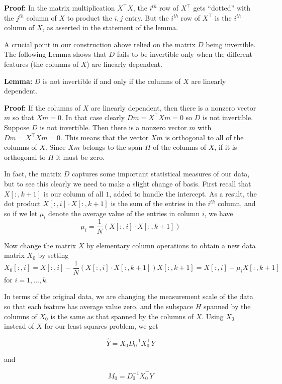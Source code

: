 \documentclass[
  oneside]{scrbook}
\begin{document}
\textbf{Proof:} In the matrix multiplication \(X^{\intercal}X\), the
\(i^{th}\) row of \(X^{\intercal}\) gets ``dotted'' with the \(j^{th}\)
column of \(X\) to product the \(i,j\) entry. But the \(i^{th}\) row of
\(X^{\intercal}\) is the \(i^{th}\) column of \(X\), as asserted in the
statement of the lemma.

A crucial point in our construction above relied on the matrix \(D\)
being invertible. The following Lemma shows that \(D\) fails to be
invertible only when the different features (the columns of \(X\)) are
linearly dependent.

\textbf{Lemma:} \(D\) is not invertible if and only if the columns of
\(X\) are linearly dependent.

\textbf{Proof:} If the columns of \(X\) are linearly dependent, then
there is a nonzero vector \(m\) so that \(Xm=0\). In that case clearly
\(Dm=X^{\intercal}Xm=0\) so \(D\) is not invertible. Suppose \(D\) is
not invertible. Then there is a nonzero vector \(m\) with
\(Dm=X^{\intercal}Xm=0\). This means that the vector \(Xm\) is
orthogonal to all of the columns of \(X\). Since \(Xm\) belongs to the
span \(H\) of the columns of \(X\), if it is orthogonal to \(H\) it must
be zero.

In fact, the matrix \(D\) captures some important statistical measures
of our data, but to see this clearly we need to make a slight change of
basis. First recall that \(X[:,k+1]\) is our column of all \(1\), added
to handle the intercept. As a result, the dot product
\(X[:,i]\cdot X[:,k+1]\) is the sum of the entries in the \(i^{th}\)
column, and so if we let \(\mu_{i}\) denote the average value of the
entries in column \(i\), we have \[ \mu_{i} = \frac{1}{N}(X[:,i]\cdot
X[:,k+1]) \]

Now change the matrix \(X\) by elementary column operations to obtain a
new data matrix \(X_{0}\) by setting \[ X_{0}[:,i] =
X[:,i]-\frac{1}{N}(X[:,i]\cdot X[:,k+1])X[:,k+1] =
X[:,i]-\mu_{i}X[:,k+1] \] for \(i=1,\ldots, k\).

In terms of the original data, we are changing the measurement scale of
the data so that each feature has average value zero, and the subspace
\(H\) spanned by the columns of \(X_{0}\) is the same as that spanned by
the columns of \(X\). Using \(X_{0}\) instead of \(X\) for our least
squares problem, we get

\[ \hat{Y} = X_{0}D_{0}^{-1}X_{0}^{\intercal}Y \]

and

\[ M_{0} = D_{0}^{-1}X_{0}^{\intercal}Y \]
\end{document}
